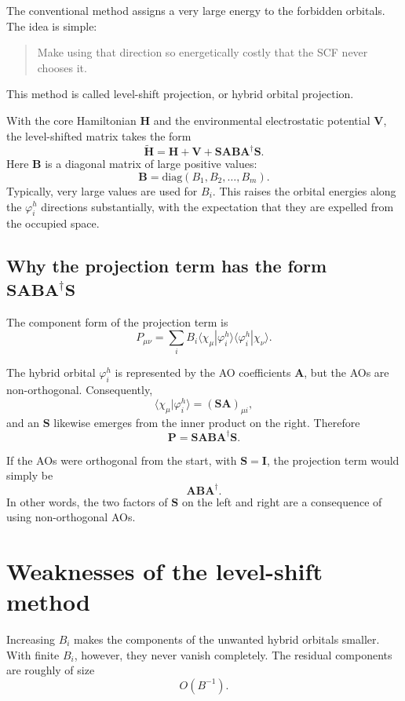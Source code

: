 \documentclass[11pt]{article}
\newcommand{\Hcore}{\mathbf H}
\newcommand{\Venv}{\mathbf V}
\newcommand{\Smat}{\mathbf S}
\newcommand{\Amat}{\mathbf A}
\newcommand{\Bmat}{\mathbf B}
\begin{document}
The conventional method assigns a very large energy to the forbidden
orbitals. The idea is simple:

\begin{quote}
Make using that direction so energetically costly that the SCF never
chooses it.
\end{quote}

This method is called level-shift projection, or hybrid orbital
projection.

With the core Hamiltonian \(\Hcore\) and the environmental
electrostatic potential \(\Venv\), the level-shifted matrix takes the
form
\[
  \widetilde{\Hcore}
  =
  \Hcore+\Venv+\Smat\Amat\Bmat\Amat^\dagger\Smat .
\]
Here \(\Bmat\) is a diagonal matrix of large positive values:
\[
  \Bmat = \mathrm{diag}(B_1,B_2,\ldots,B_m).
\]
Typically, very large values are used for \(B_i\). This raises the
orbital energies along the \(\varphi_i^h\) directions substantially,
with the expectation that they are expelled from the occupied space.

\subsection{Why the projection term has the form
\(\Smat\Amat\Bmat\Amat^\dagger\Smat\)}

The component form of the projection term is
\[
  P_{\mu\nu}
  =
  \sum_i B_i
  \langle \chi_\mu | \varphi_i^h \rangle
  \langle \varphi_i^h | \chi_\nu \rangle .
\]

The hybrid orbital \(\varphi_i^h\) is represented by the AO
coefficients \(\Amat\), but the AOs are non-orthogonal. Consequently,
\[
  \langle \chi_\mu | \varphi_i^h \rangle
  =
  (\Smat\Amat)_{\mu i} ,
\]
and an \(\Smat\) likewise emerges from the inner product on the right.
Therefore
\[
  \mathbf P = \Smat\Amat\Bmat\Amat^\dagger\Smat .
\]

If the AOs were orthogonal from the start, with \(\Smat=\mathbf I\),
the projection term would simply be
\[
  \Amat\Bmat\Amat^\dagger .
\]
In other words, the two factors of \(\Smat\) on the left and right are
a consequence of using non-orthogonal AOs.

\section{Weaknesses of the level-shift method}

Increasing \(B_i\) makes the components of the unwanted hybrid orbitals
smaller. With finite \(B_i\), however, they never vanish completely.
The residual components are roughly of size
\[
  O(B^{-1}) .
\]
\end{document}
